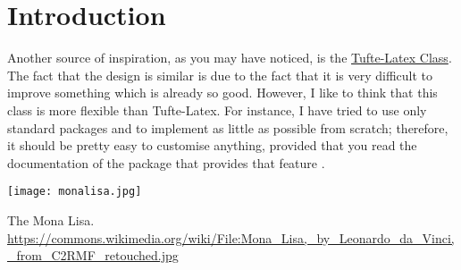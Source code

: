 \chapter{Introduction}

\blindtext

Another source of inspiration, as you may have noticed, is the
\href{https://github.com/Tufte-LaTeX/tufte-latex}{Tufte-Latex Class}.
The fact that the design is similar is due to the fact that it is very
difficult to improve something which is already so good. However, I like
to think that this class is more flexible than Tufte-Latex. For
instance, I have tried to use only standard packages and to implement as
little as possible from scratch; therefore, it should be pretty easy
to customise anything, provided that you read the documentation of the
package that provides that feature \cite{Battle2014}.


\begin{marginfigure}[+1.5cm]
	\texttt{[image: monalisa.jpg]}
	\caption[The Mona Lisa]{The Mona Lisa.\\
	\url{https://commons.wikimedia.org/wiki/File:Mona_Lisa,_by_Leonardo_da_Vinci,_from_C2RMF_retouched.jpg}}
\end{marginfigure}

